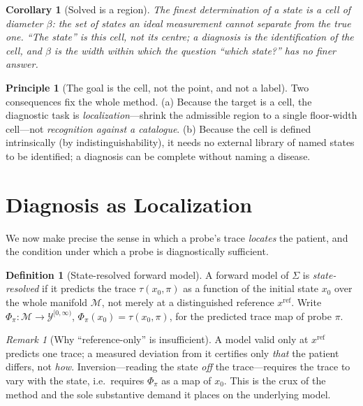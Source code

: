 \documentclass[11pt,a4paper]{article}
\theoremstyle{thmstyle}
\newtheorem{corollary}[theorem]{Corollary}
\theoremstyle{definition}
\newtheorem{definition}[theorem]{Definition}
\newtheorem{principle}[theorem]{Principle}
\theoremstyle{remark}
\newtheorem{remark}[theorem]{Remark}
\newcommand{\Man}{\mathcal{M}}          %
\newcommand{\st}{x}                     %
\newcommand{\probe}{\pi}                %
\newcommand{\trace}{\tau}               %
\newcommand{\flo}{\beta}                %
\begin{document}
\begin{corollary}[Solved is a region]
\label{cor:region}
The finest determination of a state is a \emph{cell} of diameter $\flo$:
the set of states an ideal measurement cannot separate from the true one.
``The state'' is this cell, not its centre; a diagnosis is the
identification of the cell, and $\flo$ is the width within which the
question ``which state?'' has no finer answer.
\end{corollary}

\begin{principle}[The goal is the cell, not the point, and not a label]
\label{prin:goal}
Two consequences fix the whole method. (a) Because the target is a cell,
the diagnostic task is \emph{localization}---shrink the admissible region
to a single floor-width cell---not \emph{recognition against a catalogue}.
(b) Because the cell is defined intrinsically (by indistinguishability),
it needs no external library of named states to be identified; a diagnosis
can be complete without naming a disease.
\end{principle}

\section{Diagnosis as Localization}
\label{sec:localization}

We now make precise the sense in which a probe's trace \emph{locates} the
patient, and the condition under which a probe is diagnostically
sufficient.

\begin{definition}[State-resolved forward model]
\label{def:stateresolved}
A forward model of $\Sigma$ is \emph{state-resolved} if it predicts the
trace $\trace(\st_0,\probe)$ as a function of the initial state $\st_0$
over the whole manifold $\Man$, not merely at a distinguished reference
$\st^{\mathrm{ref}}$. Write $\Phi_\probe\colon\Man\to\mathcal{Y}^{[0,\infty)}$,
$\Phi_\probe(\st_0)=\trace(\st_0,\probe)$, for the predicted trace map of
probe $\probe$.
\end{definition}

\begin{remark}[Why ``reference-only'' is insufficient]
\label{rem:reference}
A model valid only at $\st^{\mathrm{ref}}$ predicts one trace; a measured
deviation from it certifies only \emph{that} the patient differs, not
\emph{how}. Inversion---reading the state \emph{off} the trace---requires
the trace to vary with the state, i.e.\ requires $\Phi_\probe$ as a map of
$\st_0$. This is the crux of the method and the sole substantive demand it
places on the underlying model.
\end{remark}
\end{document}
